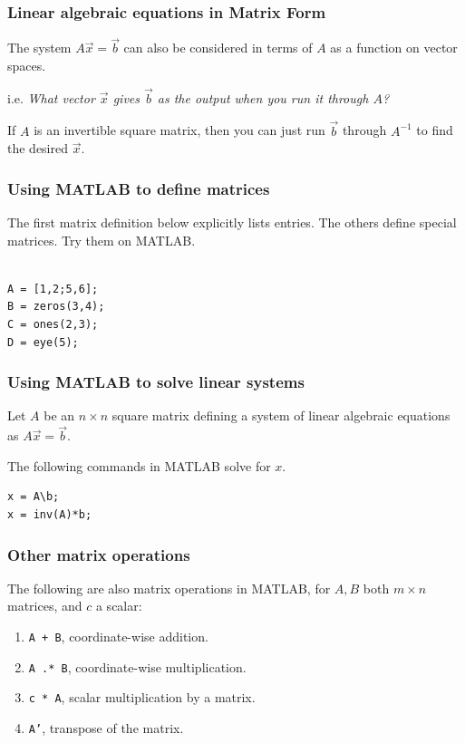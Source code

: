 \documentclass[12pt]{beamer}
\theoremstyle{definition}
\begin{document}
\begin{frame}
\frametitle{Linear algebraic equations in Matrix Form}

The system $A \vec{x} =\vec{b}$ can also be considered
in terms of $A$ as a function on vector spaces.
\vspace{3mm}

i.e. {\em What vector $\vec{x}$ gives $\vec{b}$ as the output
when you run it through $A$?}
\vspace{3mm}

If $A$ is an invertible square matrix, then you can just run $\vec{b}$
through $A^{-1}$ to find the desired $\vec{x}$.

\end{frame}

\begin{frame}[fragile]
\frametitle{Using MATLAB to define matrices}
The first matrix definition below explicitly lists entries. The 
others define special matrices. Try them on MATLAB.

\begin{verbatim}

A = [1,2;5,6];
B = zeros(3,4);
C = ones(2,3);
D = eye(5);
\end{verbatim}

\end{frame}


\begin{frame}[fragile]
\frametitle{Using MATLAB to solve linear systems}

Let $A$ be an $n\times n$ square matrix defining a
system of linear algebraic equations as $A \vec{x} = \vec{b}$.

\vspace{5mm}

The following commands in MATLAB solve for $x$.
\begin{verbatim}
x = A\b;
x = inv(A)*b;
\end{verbatim}

\end{frame}

\begin{frame}
\frametitle{Other matrix operations}
The following are also matrix operations in MATLAB, for 
$A, B$ both $m \times n$ matrices, and $c$ a scalar:
\begin{enumerate}
\item {\tt A + B}, coordinate-wise addition.
\item {\tt A .* B}, coordinate-wise multiplication.
\item {\tt c * A}, scalar multiplication by a matrix.
\item {\tt A'}, transpose of the matrix.
\end{enumerate}
\end{frame}
\end{document}
